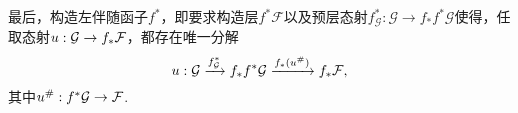 最后，构造左伴随函子$f^*$，即要求构造层$f^*\mathcal F$以及预层态射$f^*_{\mathcal G}:\mathcal G\to f_*f^*\mathcal G$使得，任取态射$u:\mathcal{G} \to f_*\mathcal{F}$，都存在唯一分解
\[
	u : \mathcal{G} \xrightarrow{f^*_{\mathcal{G}}} f_*f^*\mathcal{G}\xrightarrow{f_*(u^\#)} f_*\mathcal{F},
\]
其中$u^\#:f^*\mathcal G\to \mathcal{F}$.






